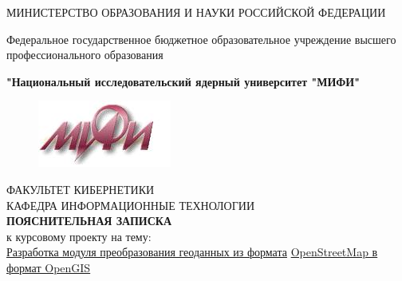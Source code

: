 \documentclass[12pt,a4paper,oneside]{article} %
\begin{document}
\singlespacing %
\pagestyle{empty} %

\newpage
\begin{center}
МИНИСТЕРСТВО ОБРАЗОВАНИЯ И НАУКИ РОССИЙСКОЙ ФЕДЕРАЦИИ

Федеральное государственное бюджетное образовательное учреждение \linebreak
высшего профессионального образования

\textbf{"Национальный исследовательский ядерный университет "МИФИ"}
\\[10pt]

\begin{figure}[h]
\includegraphics[trim=-10 40 30 0,width=0.25\linewidth]{mifi}
\end{figure}

ФАКУЛЬТЕТ КИБЕРНЕТИКИ
\\[15pt]

КАФЕДРА ИНФОРМАЦИОННЫЕ ТЕХНОЛОГИИ
\\[60pt]

\LARGE{\textbf{ПОЯСНИТЕЛЬНАЯ ЗАПИСКА}}
\\[10pt]

\large{к курсовому проекту на тему:}
\\[10pt]

\large{\underline{Разработка модуля преобразования геоданных из формата\hspace{4cm}} \linebreak
\underline{OpenStreetMap в формат OpenGIS\hspace{9,36cm}}}
\\[50pt]
\end{center}
\end{document}
